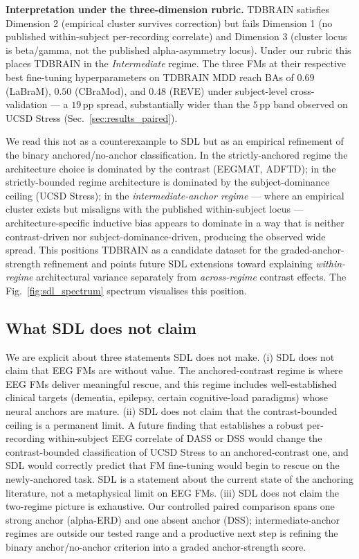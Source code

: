 \textbf{Interpretation under the three-dimension rubric.} TDBRAIN
satisfies Dimension 2 (empirical cluster survives correction) but
fails Dimension 1 (no published within-subject per-recording
correlate) and Dimension 3 (cluster locus is beta/gamma, not the
published alpha-asymmetry locus). Under our rubric this places
TDBRAIN in the \emph{Intermediate} regime. The three FMs at their
respective best fine-tuning hyperparameters on TDBRAIN MDD reach BAs
of $0.69$ (LaBraM), $0.50$ (CBraMod), and $0.48$ (REVE) under
subject-level cross-validation --- a $19$\,pp spread, substantially
wider than the $5$\,pp band observed on UCSD Stress
(Sec.~\ref{sec:results_paired}).

We read this not as a counterexample to SDL but as an empirical
refinement of the binary anchored/no-anchor classification. In the
strictly-anchored regime the architecture choice is dominated by the
contrast (EEGMAT, ADFTD); in the strictly-bounded regime architecture
is dominated by the subject-dominance ceiling (UCSD Stress); in the
\emph{intermediate-anchor regime} --- where an empirical cluster
exists but misaligns with the published within-subject locus ---
architecture-specific inductive bias appears to dominate in a way
that is neither contrast-driven nor subject-dominance-driven,
producing the observed wide spread. This positions TDBRAIN as a
candidate dataset for the graded-anchor-strength refinement and
points future SDL extensions toward explaining \emph{within-regime}
architectural variance separately from \emph{across-regime} contrast
effects. The Fig.~\ref{fig:sdl_spectrum} spectrum visualises this
position.

\subsection{What SDL does not claim}
We are explicit about three statements SDL does not make. (i) SDL
does not claim that EEG FMs are without value. The anchored-contrast
regime is where EEG FMs deliver meaningful rescue, and this regime
includes well-established clinical targets (dementia, epilepsy,
certain cognitive-load paradigms) whose neural anchors are mature.
(ii) SDL does not claim that the contrast-bounded ceiling is a
permanent limit. A future finding that establishes a robust
per-recording within-subject EEG correlate of DASS or DSS would
change the contrast-bounded classification of UCSD Stress to an
anchored-contrast one, and SDL would correctly predict that FM
fine-tuning would begin to rescue on the newly-anchored task. SDL is
a statement about the current state of the anchoring literature, not
a metaphysical limit on EEG FMs. (iii) SDL does not claim the
two-regime picture is exhaustive. Our controlled paired comparison
spans one strong anchor (alpha-ERD) and one absent anchor (DSS);
intermediate-anchor regimes are outside our tested range and a
productive next step is refining the binary anchor/no-anchor
criterion into a graded anchor-strength score.

